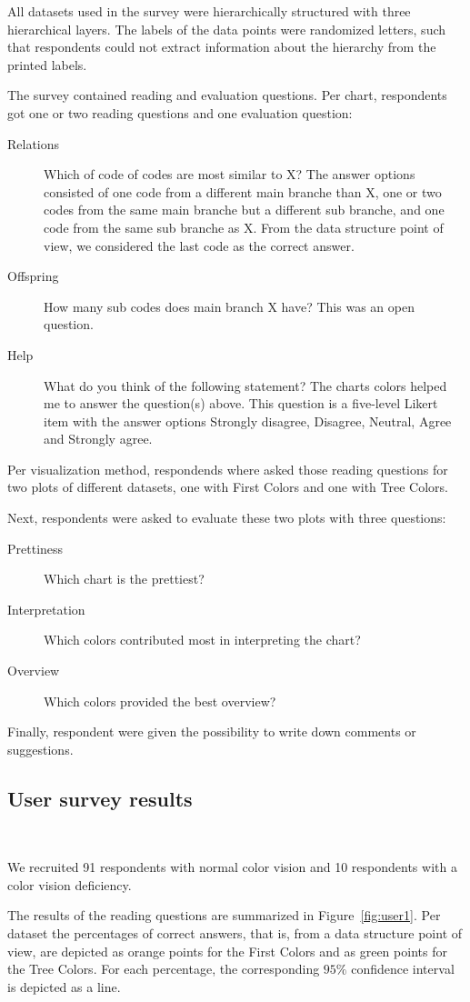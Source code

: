 \documentclass[journal]{vgtc}                %
\begin{document}
All datasets used in the survey were hierarchically structured with three hierarchical layers. The labels of the data points were randomized letters, such that respondents could not extract information about the hierarchy from the printed labels.

The survey contained reading and evaluation questions. Per chart, respondents got one or two reading questions and one evaluation question:
\begin{description}
\item[Relations] Which of code of codes are most similar to X? The answer options consisted of one code from a different main branche than X, one or two codes from the same main branche but a different sub branche, and one code from the same sub branche as X. From the data structure point of view, we considered the last code as the correct answer.
\item[Offspring] How many sub codes does main branch X have? This was an open question.
\item[Help] What do you think of the following statement? The charts colors helped me to answer the question(s) above. This question is a five-level Likert item with the answer options Strongly disagree, Disagree, Neutral, Agree and Strongly agree.
\end{description}
Per visualization method, respondends where asked those reading questions for two plots of different datasets, one with First Colors and one with Tree Colors. 

Next, respondents were asked to evaluate these two plots with three questions:
\begin{description}
\item[Prettiness] Which chart is the prettiest?
\item[Interpretation] Which colors contributed most in interpreting the chart?
\item[Overview] Which colors provided the best overview?
\end{description}
Finally, respondent were given the possibility to write down comments or suggestions.

\subsection{User survey results}~\label{secuserres}

We recruited 91 respondents with normal color vision and 10 respondents with a color vision deficiency.

The results of the reading questions are summarized in Figure~\ref{fig:user1}. Per dataset the percentages of correct answers, that is, from a data structure point of view, are depicted as orange points for the First Colors and as green points for the Tree Colors. For each percentage, the corresponding $95\%$ confidence interval is depicted as a line.
\end{document}
